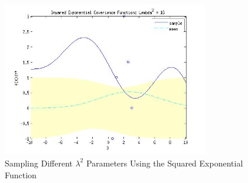 \documentclass{article}
\begin{document}
\begin{enumerate}[label=(\alph*)]
\begin{figure}[H]
\centering
\includegraphics[width=0.8\textwidth]{1_f_3.jpg}
\caption{Sampling Different $\lambda^2$ Parameters Using the Squared Exponential Function}
\label{fig:1f3}
\end{figure}

\end{enumerate}
\end{document}
